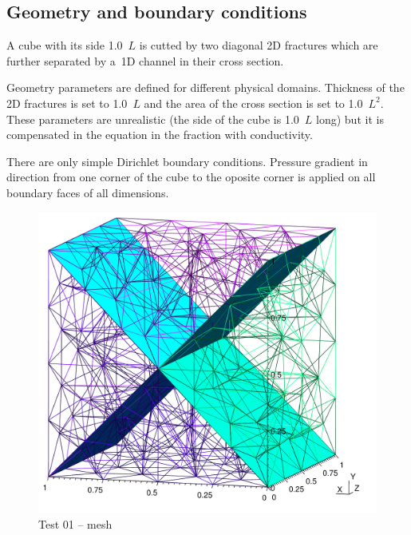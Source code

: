 \subsection*{Geometry and boundary conditions}
A cube with its side 1.0~$L$ is cutted by two diagonal 2D fractures which are further separated by a~1D channel in their cross section.

Geometry parameters are defined for different physical domains. Thickness of the 2D fractures is set to 1.0~$L$ and the area of the cross section is set to 1.0~$L^2$. These parameters are unrealistic (the side of the cube is 1.0~$L$ long) but it is compensated in the equation in the fraction with conductivity.

There are only simple Dirichlet boundary conditions. Pressure gradient in direction from one corner of the cube to the oposite corner is applied on all boundary faces of all dimensions.
%
\begin{figure}[htb!]
\centering
\includegraphics[width=13cm]{tests_graphics/01_mesh.pdf}
\caption{Test 01 -- mesh}
\label{fig:test1_mesh}
\end{figure}
%
%
